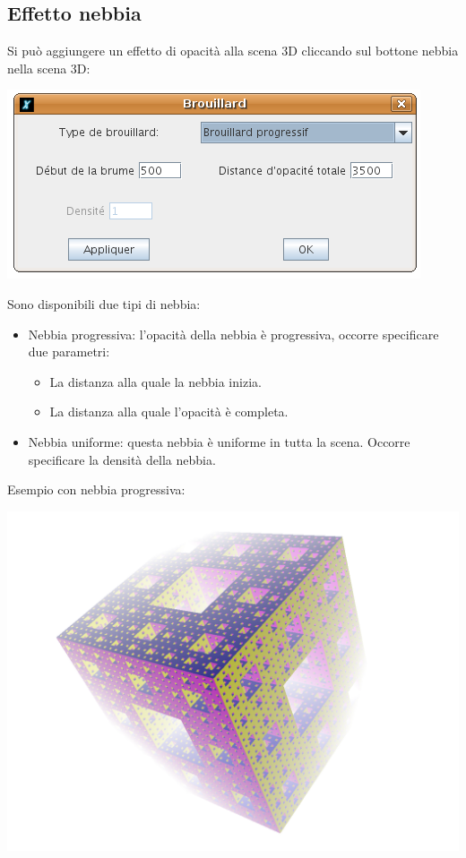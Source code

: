 \subsection{Effetto nebbia}
Si può aggiungere un effetto di opacità alla scena 3D cliccando sul bottone nebbia nella scena 3D:
\begin{center}
	\includegraphics*[scale=0.6]{pics/CaptureFog.png}
\end{center}
Sono disponibili due tipi di nebbia:
\begin{itemize}
	\item Nebbia progressiva: l'opacità della nebbia è progressiva, occorre specificare due parametri:
	\begin{itemize}
		\item La distanza alla quale la nebbia inizia.
		\item La distanza alla quale l'opacità è completa.\\
	\end{itemize}
	\item Nebbia uniforme: questa nebbia è uniforme in tutta la scena. Occorre specificare la densità della nebbia.
\end{itemize}
\vspace*{0.2cm}
Esempio con nebbia progressiva:
\begin{center}
	\includegraphics*[scale=0.4]{pics/example-fog.png}
\end{center}



